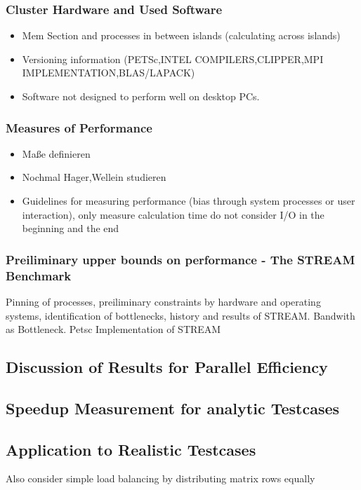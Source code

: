 \documentclass[article,type=msc,colorback,accentcolor=tud2a]{tudthesis}
\begin{document}
      \subsubsection{Cluster Hardware and Used Software}
        \begin{itemize}
          \item Mem Section and processes in between islands (calculating across islands)
          \item Versioning information (PETSc,INTEL COMPILERS,CLIPPER,MPI IMPLEMENTATION,BLAS/LAPACK)
          \item Software not designed to perform well on desktop PCs.
        \end{itemize}

      \subsubsection{Measures of Performance}
        \begin{itemize}
          \item Maße definieren
          \item Nochmal Hager,Wellein studieren
          \item Guidelines for measuring performance (bias through system processes or user interaction), only measure calculation time do not consider I/O in the beginning and the end
        \end{itemize}
      \subsubsection{Preiliminary upper bounds on performance - The STREAM Benchmark}
        Pinning of processes, preiliminary constraints by hardware and operating systems, identification of bottlenecks, history and results of STREAM. Bandwith as Bottleneck. Petsc Implementation of STREAM
      \subsection{Discussion of Results for Parallel Efficiency}
      \subsection{Speedup Measurement for analytic Testcases}
    \subsection{Application to Realistic Testcases}
      Also consider simple load balancing by distributing matrix rows equally
      
\end{document}

